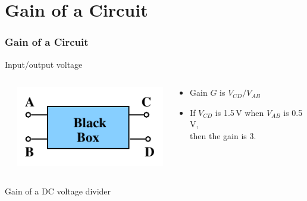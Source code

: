 \documentclass[beamer]{standalone}
\begin{document}
\section{Gain of a Circuit}
\begin{frame}[t]
 \frametitle{Gain of a Circuit}
 \begin{block}{Input/output voltage}
  \begin{columns}
   \begin{column}{0.0\textwidth}
   \end{column}
   \begin{column}{0.35\textwidth}
    \includegraphics[width=\textwidth]{pics/Black_box}
   \end{column}
   \begin{column}{0.65\textwidth}
    \begin{itemize}
     \item Gain $G$ is $V_{CD} / V_{AB}$
     \item If $V_{CD}$ is 1.5\,V when $V_{AB}$ is 0.5\,V, \\ then the gain is 3.
    \end{itemize}
   \end{column}
  \end{columns}
 \end{block}
 \begin{block}{Gain of a DC voltage divider}
  \begin{columns}
   \begin{column}{0.0\textwidth}
   \end{column}
   \begin{column}{0.2\textwidth}

\end{column}
\end{columns}
\end{block}
\end{frame}
\end{document}
